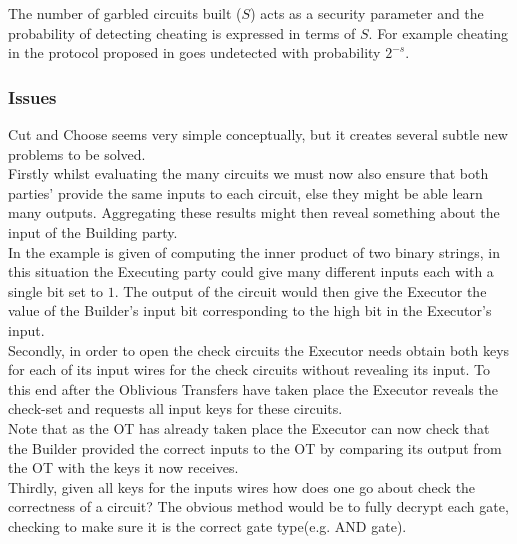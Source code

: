 \documentclass[ %
                    author={Nicholas Tutte},
                supervisor={Prof. Nigel Smart},
                    degree={MEng},
                     title={Secure Two Party Computation},
                  subtitle={A practical comparison of recent protocols},
                      type={Research - GG1K},
                      year={2015} ]{dissertation}
\begin{document}
				The number of garbled circuits built ($S$) acts as a security parameter and the probability of detecting cheating is expressed in terms of $S$. For example cheating in the protocol proposed in \cite{Lindell_CnC_2013} goes undetected with probability $2^{-s}$.

			\subsubsection{Issues}
				Cut and Choose seems very simple conceptually, but it creates several subtle new problems to be solved.\\

				Firstly whilst evaluating the many circuits we must now also ensure that both parties' provide the same inputs to each circuit, else they might be able learn many outputs. Aggregating these results might then reveal something about the input of the Building party.\\

				In \cite{LindellAndPinkas2007} the example is given of computing the inner product of two binary strings, in this situation the Executing party could give many different inputs each with a single bit set to $1$. The output of the circuit would then give the Executor the value of the Builder's input bit corresponding to the high bit in the Executor's input.\\

				Secondly, in order to open the check circuits the Executor needs obtain both keys for each of its input wires for the check circuits without revealing its input. To this end after the Oblivious Transfers have taken place the Executor reveals the check-set and requests all input keys for these circuits.\\

				Note that as the OT has already taken place the Executor can now check that the Builder provided the correct inputs to the OT by comparing its output from the OT with the keys it now receives.\\


				Thirdly, given all keys for the inputs wires how does one go about check the correctness of a circuit? The obvious method would be to fully decrypt each gate, checking to make sure it is the correct gate type(e.g. AND gate).\\
\end{document}
